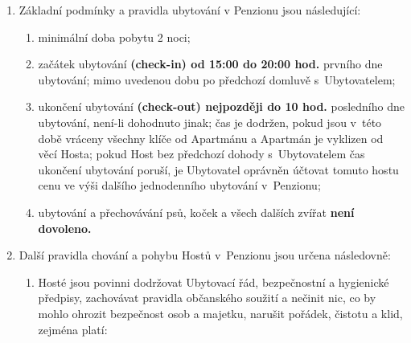 \documentclass[a4paper]{scrartcl}
\begin{document}
\begin{enumerate}

  \item
        Základní podmínky a pravidla ubytování v Penzionu jsou následující:

        \begin{enumerate}

          \item
                minimální doba pobytu 2 noci;
          \item
                začátek ubytování \textbf{(check-in) od 15:00 do 20:00 hod.}
                prvního dne ubytování; mimo uvedenou dobu po předchozí domluvě
                s~Ubytovatelem;
          \item
                ukončení ubytování \textbf{(check-out) nejpozději do 10 hod.}
                posledního dne ubytování, není-li dohodnuto jinak; čas je dodržen,
                pokud jsou v~této době vráceny všechny klíče od Apartmánu a
                Apartmán je vyklizen od věcí Hosta; pokud Host bez předchozí
                dohody s~Ubytovatelem čas ukončení ubytování poruší, je Ubytovatel
                oprávněn účtovat tomuto hostu cenu ve výši dalšího jednodenního
                ubytování v~Penzionu;
          \item
                ubytování a přechovávání psů, koček a všech dalších zvířat
                \textbf{není dovoleno.}
        \end{enumerate}
  \item
        Další pravidla chování a pohybu Hostů v~Penzionu jsou určena
        následovně:

        \begin{enumerate}

          \item
                Hosté jsou povinni dodržovat Ubytovací řád, bezpečnostní a
                hygienické předpisy, zachovávat pravidla občanského soužití a
                nečinit nic, co by mohlo ohrozit bezpečnost osob a majetku,
                narušit pořádek, čistotu a klid, zejména platí:

                \begin{enumerate}


\end{enumerate}
\end{enumerate}
\end{enumerate}
\end{document}
